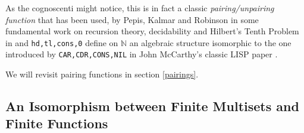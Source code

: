 \documentclass[]{INCLUDES/llncs}
\begin{document}
As the cognoscenti might notice, this is in fact a classic {\em
pairing/unpairing function} that has been used, by Pepis, Kalmar and Robinson 
in some fundamental work on recursion theory, 
decidability and Hilbert's Tenth Problem in
\cite{pepis,kalmar1,robinson50,robinson68a,robinsons68b} and 
{\tt hd,tl,cons,0}
define on $\mathbb{N}$ an algebraic structure isomorphic to the one 
introduced by {\tt CAR,CDR,CONS,NIL} in John McCarthy's classic LISP paper
\cite{mccarthy60}.

\begin{comment}
Alternatively, using the implicit list structure induced by {\tt cons, hd, tl}
one can design the following pairing/unpairng functions:
\begin{code}
cpair  (0,0)  = 0
cpair  (0,y)  = cons e (cpair (y,0))
cpair  (x,y) = cons (hd x) (cpair (y,(tl x)))  
 
cunpair 0 = (0,0)
cunpair z = (cons (hd z) x,y) where (y,x)=cunpair (tl z)
\end{code}
working as follows:
\begin{codex}

\end{codex}
\end{comment}

We will revisit pairing functions in section \ref{pairings}.

\subsection{An Isomorphism between Finite Multisets and Finite Functions}
\label{msetiso}
\end{document}
